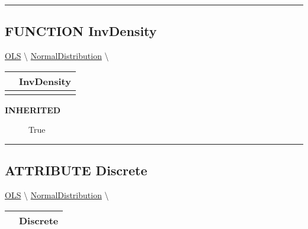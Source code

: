 \rule{\linewidth}{0.5pt}
\subsection*{\textsf{\colorbox{headtoc}{\color{white} FUNCTION}
InvDensity}}

\hypertarget{ecldoc:linearregression.ols.distributionbase.invdensity}{}
\hspace{0pt} \hyperlink{ecldoc:linearregression.ols}{OLS} \textbackslash 
\hspace{0pt} \hyperlink{ecldoc:linearregression.ols.normaldistribution}{NormalDistribution} \textbackslash 

{\renewcommand{\arraystretch}{1.5}
\begin{tabularx}{\textwidth}{|>{\raggedright\arraybackslash}l|X|}
\hline
\hspace{0pt}\mytexttt{\color{red} } & \textbf{InvDensity} \\
\hline
\multicolumn{2}{|>{\raggedright\arraybackslash}X|}{\hspace{0pt}\mytexttt{\color{param} (t\_FieldReal delta)}} \\
\hline
\end{tabularx}
}

\par

\par
\begin{description}
\item [\colorbox{tagtype}{\color{white} \textbf{\textsf{INHERITED}}}] \textbf{\underline{}} True
\end{description}

\rule{\linewidth}{0.5pt}
\subsection*{\textsf{\colorbox{headtoc}{\color{white} ATTRIBUTE}
Discrete}}

\hypertarget{ecldoc:linearregression.ols.distributionbase.discrete}{}
\hspace{0pt} \hyperlink{ecldoc:linearregression.ols}{OLS} \textbackslash 
\hspace{0pt} \hyperlink{ecldoc:linearregression.ols.normaldistribution}{NormalDistribution} \textbackslash 

{\renewcommand{\arraystretch}{1.5}
\begin{tabularx}{\textwidth}{|>{\raggedright\arraybackslash}l|X|}
\hline
\hspace{0pt}\mytexttt{\color{red} } & \textbf{Discrete} \\
\hline
\end{tabularx}
}

